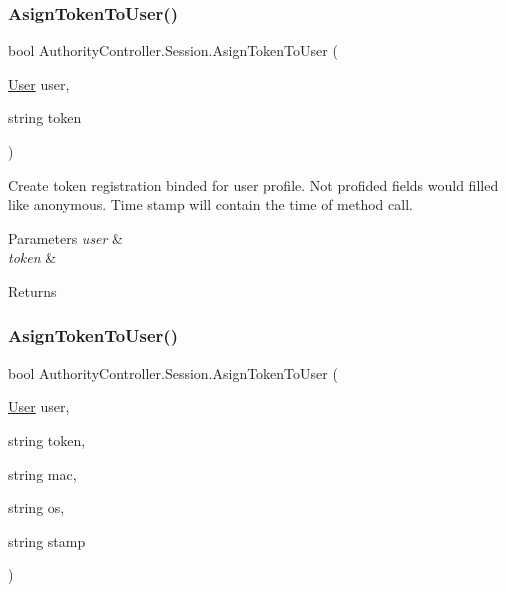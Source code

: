 \subsubsection{\texorpdfstring{Asign\+Token\+To\+User()}{AsignTokenToUser()}\hspace{0.1cm}{\footnotesize\ttfamily [1/2]}}
{\footnotesize\ttfamily bool Authority\+Controller.\+Session.\+Asign\+Token\+To\+User (\begin{DoxyParamCaption}\item[{\mbox{\hyperlink{class_authority_controller_1_1_data_1_1_personal_1_1_user}{User}}}]{user,  }\item[{string}]{token }\end{DoxyParamCaption})}



Create token registration binded for user profile. Not profided fields would filled like anonymous. Time stamp will contain the time of method call. 


\begin{DoxyParams}{Parameters}
{\em user} & \\
\hline
{\em token} & \\
\hline
\end{DoxyParams}
\begin{DoxyReturn}{Returns}

\end{DoxyReturn}
\mbox{\label{class_authority_controller_1_1_session_ab164831d0a5fc909c200feba1ac882e4}} 
\subsubsection{\texorpdfstring{Asign\+Token\+To\+User()}{AsignTokenToUser()}\hspace{0.1cm}{\footnotesize\ttfamily [2/2]}}
{\footnotesize\ttfamily bool Authority\+Controller.\+Session.\+Asign\+Token\+To\+User (\begin{DoxyParamCaption}\item[{\mbox{\hyperlink{class_authority_controller_1_1_data_1_1_personal_1_1_user}{User}}}]{user,  }\item[{string}]{token,  }\item[{string}]{mac,  }\item[{string}]{os,  }\item[{string}]{stamp }\end{DoxyParamCaption})}



